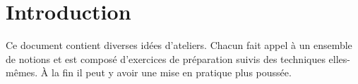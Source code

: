 \section*{Introduction}


Ce document contient diverses idées d'ateliers.
Chacun fait appel à un ensemble de notions et est composé d'exercices de préparation suivis des techniques elles-mêmes.
À la fin il peut y avoir une mise en pratique plus poussée.

